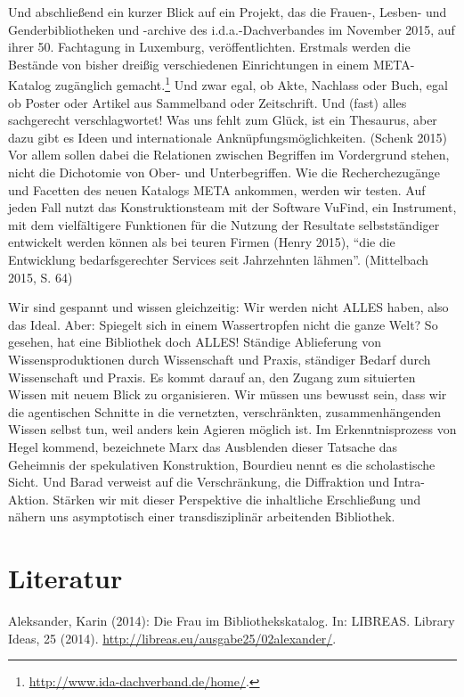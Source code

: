 Und abschließend ein kurzer Blick auf ein Projekt, das die Frauen-,
Lesben- und Genderbibliotheken und -archive des i.d.a.-Dachverbandes im
November 2015, auf ihrer 50. Fachtagung in Luxemburg, veröffentlichten.
Erstmals werden die Bestände von bisher dreißig verschiedenen
Einrichtungen in einem META-Katalog zugänglich gemacht.\footnote{\url{http://www.ida-dachverband.de/home/}.}
Und zwar egal, ob Akte, Nachlass oder Buch, egal ob Poster oder Artikel
aus Sammelband oder Zeitschrift. Und (fast) alles sachgerecht
verschlagwortet! Was uns fehlt zum Glück, ist ein Thesaurus, aber dazu
gibt es Ideen und internationale Anknüpfungsmöglichkeiten. (Schenk 2015)
Vor allem sollen dabei die Relationen zwischen Begriffen im Vordergrund
stehen, nicht die Dichotomie von Ober- und Unterbegriffen. Wie die
Recherchezugänge und Facetten des neuen Katalogs META ankommen, werden
wir testen. Auf jeden Fall nutzt das Konstruktionsteam mit der Software
VuFind, ein Instrument, mit dem vielfältigere Funktionen für die Nutzung
der Resultate selbstständiger entwickelt werden können als bei teuren
Firmen (Henry 2015), \enquote{die die Entwicklung bedarfsgerechter
Services seit Jahrzehnten lähmen}. (Mittelbach 2015, S. 64)

Wir sind gespannt und wissen gleichzeitig: Wir werden nicht ALLES haben,
also das Ideal. Aber: Spiegelt sich in einem Wassertropfen nicht die
ganze Welt? So gesehen, hat eine Bibliothek doch ALLES! Ständige
Ablieferung von Wissensproduktionen durch Wissenschaft und Praxis,
ständiger Bedarf durch Wissenschaft und Praxis. Es kommt darauf an, den
Zugang zum situierten Wissen mit neuem Blick zu organisieren. Wir müssen
uns bewusst sein, dass wir die agentischen Schnitte in die vernetzten,
verschränkten, zusammenhängenden Wissen selbst tun, weil anders kein
Agieren möglich ist. Im Erkenntnisprozess von Hegel kommend, bezeichnete
Marx das Ausblenden dieser Tatsache das Geheimnis der spekulativen
Konstruktion, Bourdieu nennt es die scholastische Sicht. Und Barad
verweist auf die Verschränkung, die Diffraktion und Intra-Aktion.
Stärken wir mit dieser Perspektive die inhaltliche Erschließung und
nähern uns asymptotisch einer transdisziplinär arbeitenden Bibliothek.

\section*{Literatur}

Aleksander, Karin (2014): Die Frau im Bibliothekskatalog. In: LIBREAS.
Library Ideas, 25 (2014).
\url{http://libreas.eu/ausgabe25/02alexander/}.

